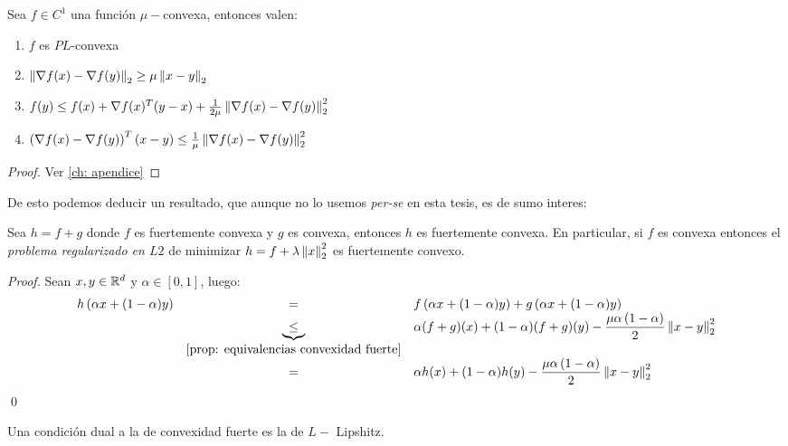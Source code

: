 \begin{proposition}
	\label{prop: implicancias de convexidad fuerte}
	Sea $f \in C^1$ una funci\'on $\mu-$convexa, entonces valen:
	\begin{enumerate}
		\item $f$ es $PL$-convexa
		\item $\left\lVert\nabla f(x) - \nabla f(y)\right\rVert_2 \geq \mu \left\lVert x-y\right\rVert_2$
		\item $f(y) \leq f(x) + \nabla f(x)^T (y-x) + \frac{1}{2 \mu} \left\lVert\nabla f(x) - \nabla f(y)\right\rVert_2^2$
		\item $ \left(\nabla f(x) - \nabla f(y)\right)^T (x-y) \leq \frac{1}{\mu} \left\lVert\nabla f(x) - \nabla f(y)\right\rVert_2^2$
	\end{enumerate}
\end{proposition}

\begin{proof}
	Ver \ref{ch: apendice}
\end{proof}

De esto podemos deducir un resultado, que aunque no lo usemos \textit{per-se} en esta tesis, es de sumo interes:

\begin{corollary}
	\label{coro: convexa y fuertemente convexa es fuertemente convexa}
	Sea $h = f+g$ donde $f$ es fuertemente convexa y $g$ es convexa, entonces $h$ es fuertemente convexa. En particular, si $f$ es convexa entonces el \textit{problema regularizado en $L2$} de minimizar $h = f + \lambda \left\lVert x\right\rVert_2^2$ es fuertemente convexo.
\end{corollary}

\begin{proof}
	Sean $x,y \in {\mathbb{R}}^d$ y $\alpha \in [0,1]$, luego:
	\begin{equation*}
	\begin{array}{rcl}
	h\left(\alpha x + (1-\alpha)y\right) & = & f\left(\alpha x + (1-\alpha)y\right)  + g\left(\alpha x + (1-\alpha)y\right)  \\
	& \underbrace{\leq}_{\ref{prop: equivalencias convexidad fuerte}} & \alpha(f + g)(x) + (1-\alpha)(f+g)(y) - \dfrac{\mu \alpha \left(1-\alpha\right)}{2} \left\lVert x-y\right\rVert^2_2 \\
	& = & \alpha h(x) + (1-\alpha)h(y) - \dfrac{\mu \alpha \left(1-\alpha\right)}{2} \left\lVert x-y\right\rVert^2_2 
	\end{array}
	\end{equation*}\qed
\end{proof}

Una condici\'on dual a la de convexidad fuerte es la de $L-$ Lipshitz.

